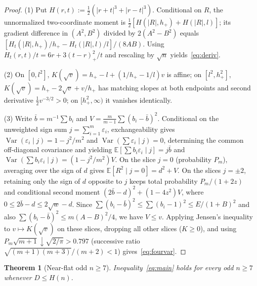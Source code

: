 \documentclass[11pt]{article}
\theoremstyle{plain}
\newtheorem{theorem}{Theorem}
\theoremstyle{definition}
\theoremstyle{remark}
\DeclareMathOperator{\Var}{Var}
\begin{document}
\begin{proof}
(1) Put $H(r, t) := \frac{1}{2}(|r + t|^3 + |r - t|^3)$.
Conditional on $R$, the unnormalized two-coordinate moment is $\frac{1}{2}[H(|R|, h_+) + H(|R|, l)]$; its gradient difference in $(A^2, B^2)$ divided by $2(A^2 - B^2)$ equals $[H_t(|R|, h_+)/h_+ - H_t(|R|, l)/l]/(8AB)$.
Using $H_t(r, t)/t = 6r + 3(t - r)_+^2/t$ and rescaling by $\sqrt{n}$ yields~\eqref{eq:deriv}.

(2) On $[0, l^2]$, $K(\sqrt{v}) = h_+ - l + (1/h_+ - 1/l)v$ is affine; on $[l^2, h_+^2]$, $K(\sqrt{v}) = h_+ - 2\sqrt{v} + v/h_+$ has matching slopes at both endpoints and second derivative $\frac{1}{2}v^{-3/2} > 0$; on $[h_+^2, \infty)$ it vanishes identically.

(3) Write $\bar{b} = m^{-1}\sum b_i$ and $V = \frac{m}{m - 1}\sum (b_i - \bar{b})^2$.
Conditional on the unweighted sign sum $j = \sum_{i=1}^m \varepsilon_i$, exchangeability gives $\Var(\varepsilon_i \mid j) = 1 - j^2/m^2$ and $\Var(\sum \varepsilon_i \mid j) = 0$, determining the common off-diagonal covariance and yielding $\mathbb{E}[\sum b_i \varepsilon_i \mid j] = j\bar{b}$ and $\Var(\sum b_i \varepsilon_i \mid j) = (1 - j^2/m^2)V$.
On the slice $j = 0$ (probability $P_m$), averaging over the sign of $d$ gives $\mathbb{E}[R^2 \mid j = 0] = d^2 + V$.
On the slices $j = \pm 2$, retaining only the sign of $d$ opposite to $j$ keeps total probability $P_m/(1 + 2z)$ and conditional second moment $(2\bar{b} - d)^2 + (1 - 4z^2)V$, where $0 \le 2\bar{b} - d \le 2\sqrt{w} - d$.
Since $\sum(b_i - \bar{b})^2 \le \sum(b_i - 1)^2 \le E/(1 + B)^2$ and also $\sum(b_i - \bar{b})^2 \le m(A - B)^2/4$, we have $V \le v$.
Applying Jensen's inequality to $v \mapsto K(\sqrt{v})$ on these slices, dropping all other slices ($K \ge 0$), and using $P_m\sqrt{m + 1} \downarrow \sqrt{2/\pi} > 0.797$ (successive ratio $\sqrt{(m+1)(m+3)}/(m+2) < 1$) gives~\eqref{eq:fourvar}.
\end{proof}

\begin{theorem}[Near-flat odd $n \ge 7$]\label{thm:near}
Inequality~\eqref{eq:main} holds for every odd $n \ge 7$ whenever $D \le H(n)$.
\end{theorem}
\end{document}
